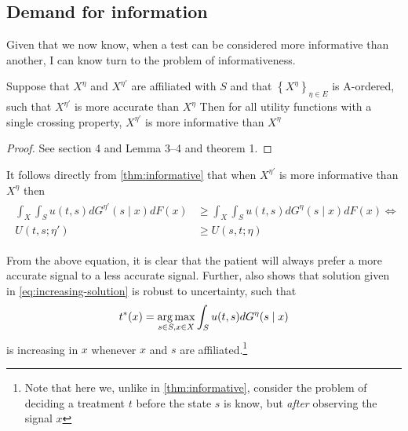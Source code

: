 \documentclass[10pt,a4paper]{article} 					%
\begin{document}

\subsection{Demand for information}

Given that we now know, when a test can be considered more informative than another, I can know turn to the problem of informativeness.

\begin{thm}\label{thm:informative}
\parencite{Persico2000}
Suppose that \(X^{\eta}\) and \(X^{\eta'}\) are affiliated with \(S\) and that \(\left \{X^{\eta}\right \} _{\eta\in E}\) is A-ordered, such that \(X^{\eta'}\) is more accurate than \(X^{\eta}\)  Then for all utility functions with a single crossing property, \(X^{\eta'}\) is more informative than \(X^{\eta}\)
\end{thm}
\begin{proof}
See \citet{Lehmann1988} section 4 and \citet{Karlin1956} Lemma 3--4 and theorem 1.
\end{proof}

It follows directly from \cref{thm:informative} that when \(X^{\eta'}\) is more informative than \(X^{\eta}\)  then
\begin{align}
	\label{eq:utility-increasing-information}
	\begin{split}
	\int_{X}\int_{S}u(t,s)dG^{\eta'}(s\mid x)dF(x)&\geq \int_{X}\int_{S}u(t,s)dG^{\eta}(s\mid x)dF(x) \Leftrightarrow \\
	U(t,s;\eta')&\geq U(s,t;\eta)
\end{split}
\end{align}

From the above equation, it is clear that the patient will always prefer a more accurate signal to a less accurate signal. Further, \textcite{Athey2002} also shows that solution given in \cref{eq:increasing-solution} is robust to uncertainty, such that
\[
	t^*(x)=\argmax_{s\in S, x\in X}\int_Su(t,s)d G^\eta(s\mid x)
\]
is increasing in \(x\)  whenever \(x\) and \(s\) are affiliated.\footnote{Note that here we, unlike in \cref{thm:informative}, consider the problem of deciding a treatment \(t\) before the state \(s\) is know, but \emph{after} observing the signal \(x\) }
\end{document}
